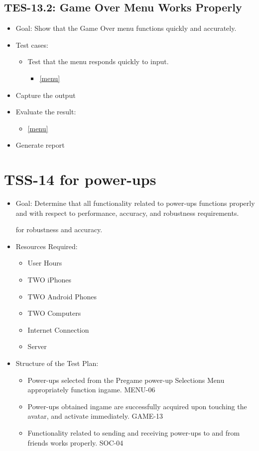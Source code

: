 \subsection{TES-13.2: Game Over Menu Works Properly }
\begin{itemize}
\item Goal: Show that the Game Over menu functions quickly and accurately. 
\item Test cases: 

\begin{itemize}
\item Test that the menu responds quickly to input.
\begin{itemize}
\item \ref{menu}
\end{itemize}
\end{itemize}
\item Capture the output 
\item Evaluate the result: 

\begin{itemize}
\item \ref{menu}
\end{itemize}
\item Generate report 
\end{itemize}



\section{TSS-14 for power-ups}
\begin{itemize}
\item Goal: Determine that all functionality related to power-ups functions properly and with respect to performance, accuracy, and robustness requirements.

for robustness and accuracy.

\item Resources Required:
\begin{itemize}
\item User Hours 
\item TWO iPhones
\item TWO Android Phones
\item TWO Computers
\item Internet Connection 
\item Server
\end{itemize}
\item Structure of the Test Plan: 

\begin{itemize}

\item Power-ups selected from the Pregame power-up Selections Menu appropriately function ingame. MENU-06
\item Power-ups obtained ingame are successfully acquired upon touching the avatar, and activate immediately. GAME-13
\item Functionality related to sending and receiving power-ups to and from friends works properly. SOC-04

\end{itemize}
\end{itemize}


